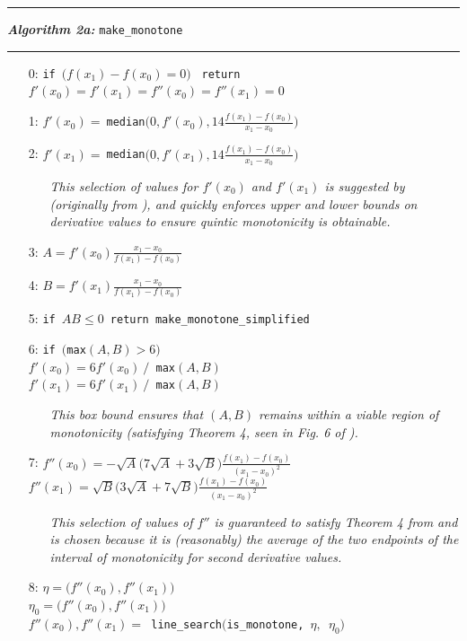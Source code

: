 \documentclass{scspaperproc}
\theoremstyle{scsthe}
\begin{document}
\vspace{10pt}%
\hrule%
\vspace{3pt}%
\noindent\textbf{\textit{Algorithm 2a:}} \texttt{make\_monotone}%
\vspace{3pt}%
\hrule%

\begin{itemize}
  \itemsep0pt
  \parskip0pt

\item[0:] \texttt{if }$\big(f(x_1) - f(x_0) = 0\big)$ \texttt{ return } $f'(x_0) = f'(x_1) = f''(x_0) = f''(x_1) = 0$
\item[1:] $f'(x_0) = \ $\texttt{median}$\big(0, f'(x_0), 14 \frac{f(x_1) - f(x_0)}{x_1 - x_0} \big)$
\item[2:] $f'(x_1) = \ $\texttt{median}$\big(0, f'(x_1), 14 \frac{f(x_1) - f(x_0)}{x_1 - x_0}\big)$
  \begin{itemize}
  \item[] \textit{This selection of values for $f'(x_0)$ and $f'(x_1)$ is suggested by \cite{ulrich1994positivity} (originally from \cite{huynh1993accurate}), and quickly enforces upper and lower bounds on derivative values to ensure quintic monotonicity is obtainable.}
  \end{itemize}
\item[3:] $A = f'(x_0)\frac{x_1 - x_0}{f(x_1) - f(x_0)}$
\item[4:] $B = f'(x_1) \frac{x_1 - x_0}{f(x_1) - f(x_0)}$
\item[5:] \texttt{if }$AB \leq 0$\texttt{ return make\_monotone\_simplified}
\item[6:] \texttt{if $\big($max}$(A,B) > 6\big)$\\$f'(x_0) = 6 f'(x_0)\  /$\texttt{ max}$(A,B)$\\$f'(x_1) = 6 f'(x_1)\  /$\texttt{ max}$(A,B)$

  \begin{itemize}
  \item[] \textit{This box bound ensures that $(A,B)$ remains within a viable region of monotonicity (satisfying Theorem 4, seen in Fig. 6 of \cite{ulrich1994positivity}).}
  \end{itemize}

\item[7:] $f''(x_0) = - \sqrt{A} \big( 7 \sqrt{A} + 3 \sqrt{B} \big) \frac{f(x_1) - f(x_0)}{(x_1 - x_0)^2}$\\$f''(x_1) = \sqrt{B} \big( 3 \sqrt{A} + 7 \sqrt{B} \big) \frac{f(x_1) - f(x_0)}{(x_1 - x_0)^2}$

  \begin{itemize}
    \item[] \textit{This selection of values of $f''$ is guaranteed to satisfy Theorem 4 from \cite{ulrich1994positivity} and is chosen because it is (reasonably) the average of the two endpoints of the interval of monotonicity for second derivative values.}
  \end{itemize}

\item[8:] $\eta = \big(f''(x_0), f''(x_1)\big)$\\$\eta_0 = \big(f''(x_0), f''(x_1)\big)$\\$f''(x_0), f''(x_1) = $\texttt{ line\_search$\big($is\_monotone, $\eta,$ $\eta_0\big)$}
\end{itemize}
\end{document}
